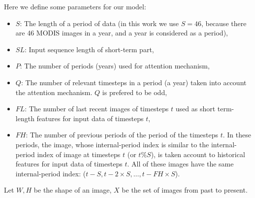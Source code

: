 Here we define some parameters for our model:
\begin{itemize}
    \item $S$: The length of a period of data (in this work we use $S = 46$, because there are 46 MODIS images in a year, and a year is considered as a period),
    \item $SL$: Input sequence length of short-term part,
    \item $P$: The number of periods (years) used for attention mechanism,
    \item $Q$: The number of relevant timesteps in a period (a year) taken into account the attention mechanism. $Q$ is prefered to be odd,
    \item $FL$: The number of last recent images of timesteps $t$ used as short term-length features for input data of timesteps $t$,
    \item $FH$: The number of previous periods of the period of the timesteps $t$. In these periods, the image, whose internal-period index is similar to the internal-period index of image at timesteps $t$ (or $t \% S$), is taken account to historical features for input data of timesteps $t$. All of these images have the same internal-period index: ($t-S, t-2 \times S,\dots, t-FH \times S$).
\end{itemize}
Let $W, H$ be the shape of an image, $X$ be the set of images from past to present.

